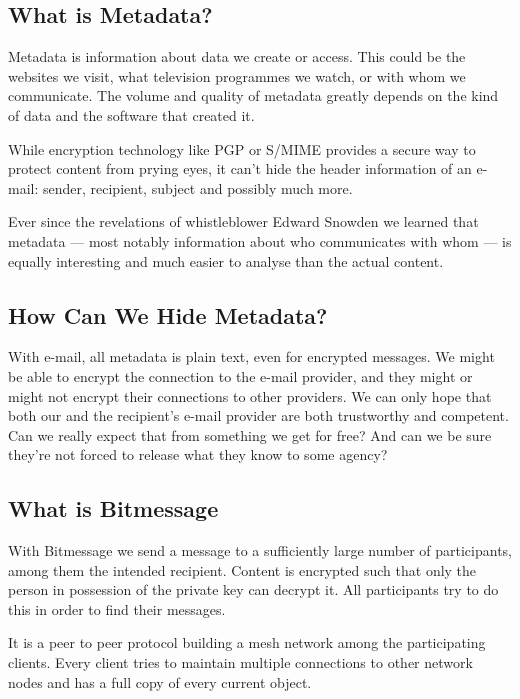 \documentclass{bfh}
\begin{document}
  \subsection{What is Metadata?}

  Metadata is information about data we create or access. This could be the websites we visit, what television programmes we watch, or with whom we communicate. The volume and quality of metadata greatly depends on the kind of data and the software that created it.

  While encryption technology like \ac{PGP} or \acs{S/MIME} provides a secure way to protect content from prying eyes, it can't hide the header information of an e-mail: sender, recipient, subject and possibly much more.

  Ever since the revelations of whistleblower Edward Snowden we learned that metadata --- most notably information about who communicates with whom --- is equally interesting and much easier to analyse than the actual content.\cite{guardian:metadata}

  \subsection{How Can We Hide Metadata?}

  With e-mail, all metadata is plain text, even for encrypted messages. We might be able to encrypt the connection to the e-mail provider, and they might or might not encrypt their connections to other providers. We can only hope that both our and the recipient's e-mail provider are both trustworthy and competent. Can we really expect that from something we get for free? And can we be sure they're not forced to release what they know to some agency?\cite{yale:nsl}

  \subsection{What is Bitmessage}
  
  With Bitmessage we send a message to a sufficiently large number of participants, among them the intended recipient. Content is encrypted such that only the person in possession of the private key can decrypt it. All participants try to do this in order to find their messages.

  It is a peer to peer protocol building a mesh network among the participating clients. Every client tries to maintain multiple connections to other network nodes and has a full copy of every current object.
  
\end{document}
